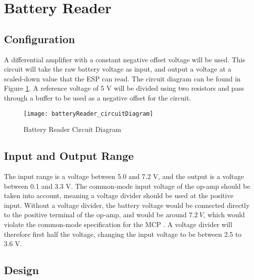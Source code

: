 \graphicspath{{content/2_design/figures/}}
\section{Battery Reader}

\subsection{Configuration}

A differential amplifier with a constant negative offset voltage will be used. This circuit will take the raw battery voltage as input,
and output a voltage at a scaled-down value that the ESP can read. The circuit diagram can be found in Figure \ref{fig:batteryReader_circuitDiagram}.
A reference voltage of 5 V will be divided using two resistors and pass through a buffer to be used as a negative offset for the circuit.

\begin{figure}[!htb]
  \centering
  \texttt{[image: batteryReader\_circuitDiagram]}
  \caption{Battery Reader Circuit Diagram}
  \label{fig:batteryReader_circuitDiagram}
\end{figure}

\subsection{Input and Output Range}

The input range is a voltage between 5.0 and 7.2 V, and the output is a voltage between 0.1 and 3.3 V. The common-mode input voltage of the op-amp should be taken into account,
meaning a voltage divider should be used at the positive input. Without a voltage divider, the battery voltage would be connected directly to the positive terminal of the op-amp,
and would be around $\SI{7.2}{V}$, which would violate the common-mode specification for the MCP \cite{datasheetMCP6242}. A voltage divider will therefore first half the voltage,
changing the input voltage to be between 2.5 to 3.6 V.

\pagebreak

\subsection{Design}

